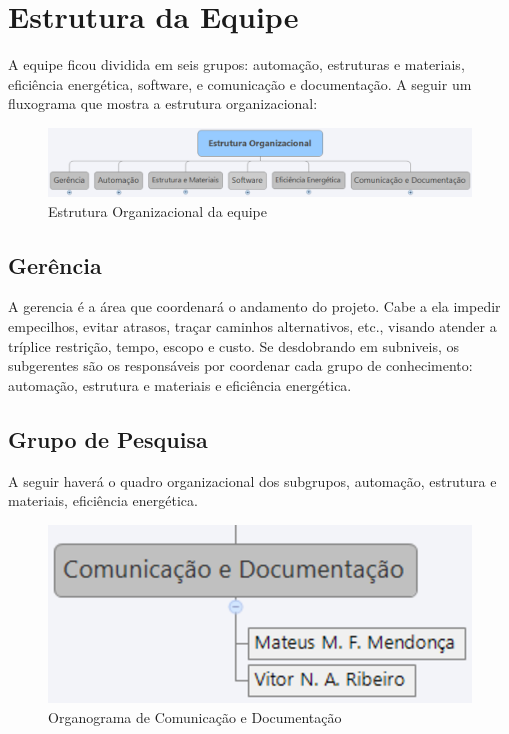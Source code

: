 \section{Estrutura da Equipe}

	A equipe ficou dividida em seis grupos: automação, estruturas e materiais, eficiência energética, software, e comunicação e documentação. A seguir um fluxograma que mostra a estrutura organizacional:

\begin{figure}[H]
  \begin{center}
	\includegraphics[keepaspectratio,scale=0.5]{figuras/estrutura_organizacional.eps}
	\caption{Estrutura Organizacional da equipe}
  \end{center}
\end{figure}

\subsection{Gerência}

	A gerencia é a área que coordenará o andamento do projeto. Cabe a ela impedir empecilhos, evitar atrasos, traçar caminhos alternativos, etc., visando atender a tríplice restrição, tempo, escopo e custo. Se desdobrando em subniveis, os subgerentes são os responsáveis por coordenar cada grupo de conhecimento: automação, estrutura e materiais e eficiência energética.

\subsection{Grupo de Pesquisa}

	A seguir haverá o quadro organizacional dos subgrupos, automação, estrutura e materiais, eficiência energética.

\begin{figure}[H]
  \begin{center}
	\includegraphics[keepaspectratio,scale=0.6]{figuras/comunicacao_documentacao.eps}
	\caption{Organograma de Comunicação e Documentação}
  \end{center}
\end{figure}

